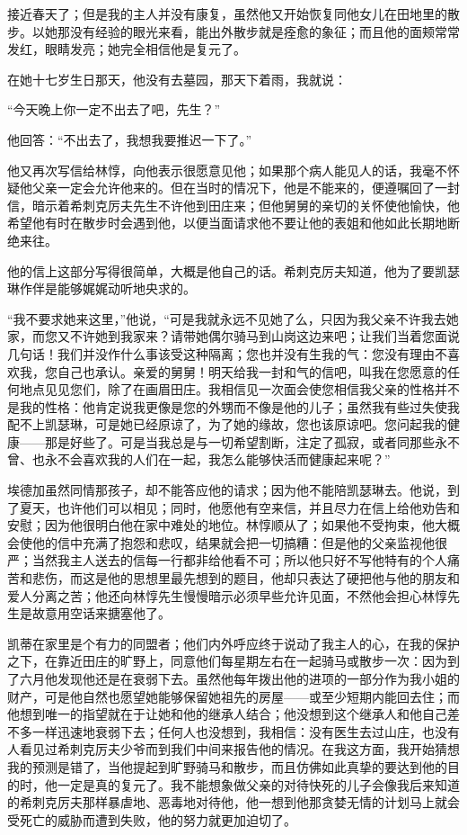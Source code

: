 \par 接近春天了；但是我的主人并没有康复，虽然他又开始恢复同他女儿在田地里的散步。以她那没有经验的眼光来看，能出外散步就是痊愈的象征；而且他的面颊常常发红，眼睛发亮；她完全相信他是复元了。
\par 在她十七岁生日那天，他没有去墓园，那天下着雨，我就说：
\par “今天晚上你一定不出去了吧，先生？”
\par 他回答：“不出去了，我想我要推迟一下了。”
\par 他又再次写信给林惇，向他表示很愿意见他；如果那个病人能见人的话，我毫不怀疑他父亲一定会允许他来的。但在当时的情况下，他是不能来的，便遵嘱回了一封信，暗示着希刺克厉夫先生不许他到田庄来；但他舅舅的亲切的关怀使他愉快，他希望他有时在散步时会遇到他，以便当面请求他不要让他的表姐和他如此长期地断绝来往。
\par 他的信上这部分写得很简单，大概是他自己的话。希刺克厉夫知道，他为了要凯瑟琳作伴是能够娓娓动听地央求的。
\par “我不要求她来这里，”他说，“可是我就永远不见她了么，只因为我父亲不许我去她家，而您又不许她到我家来？请带她偶尔骑马到山岗这边来吧；让我们当着您面说几句话！我们并没作什么事该受这种隔离；您也并没有生我的气：您没有理由不喜欢我，您自己也承认。亲爱的舅舅！明天给我一封和气的信吧，叫我在您愿意的任何地点见见您们，除了在画眉田庄。我相信见一次面会使您相信我父亲的性格并不是我的性格：他肯定说我更像是您的外甥而不像是他的儿子；虽然我有些过失使我配不上凯瑟琳，可是她已经原谅了，为了她的缘故，您也该原谅吧。您问起我的健康——那是好些了。可是当我总是与一切希望割断，注定了孤寂，或者同那些永不曾、也永不会喜欢我的人们在一起，我怎么能够快活而健康起来呢？”
\par 埃德加虽然同情那孩子，却不能答应他的请求；因为他不能陪凯瑟琳去。他说，到了夏天，也许他们可以相见；同时，他愿他有空来信，并且尽力在信上给他劝告和安慰；因为他很明白他在家中难处的地位。林惇顺从了；如果他不受拘束，他大概会使他的信中充满了抱怨和悲叹，结果就会把一切搞糟：但是他的父亲监视他很严；当然我主人送去的信每一行都非给他看不可；所以他只好不写他特有的个人痛苦和悲伤，而这是他的思想里最先想到的题目，他却只表达了硬把他与他的朋友和爱人分离之苦；他还向林惇先生慢慢暗示必须早些允许见面，不然他会担心林惇先生是故意用空话来搪塞他了。
\par 凯蒂在家里是个有力的同盟者；他们内外呼应终于说动了我主人的心，在我的保护之下，在靠近田庄的旷野上，同意他们每星期左右在一起骑马或散步一次：因为到了六月他发现他还是在衰弱下去。虽然他每年拨出他的进项的一部分作为我小姐的财产，可是他自然也愿望她能够保留她祖先的房屋——或至少短期内能回去住；而他想到唯一的指望就在于让她和他的继承人结合；他没想到这个继承人和他自己差不多一样迅速地衰弱下去；任何人也没想到，我相信：没有医生去过山庄，也没有人看见过希刺克厉夫少爷而到我们中间来报告他的情况。在我这方面，我开始猜想我的预测是错了，当他提起到旷野骑马和散步，而且仿佛如此真挚的要达到他的目的时，他一定是真的复元了。我不能想象做父亲的对待快死的儿子会像我后来知道的希刺克厉夫那样暴虐地、恶毒地对待他，他一想到他那贪婪无情的计划马上就会受死亡的威胁而遭到失败，他的努力就更加迫切了。



